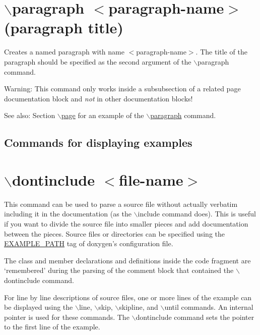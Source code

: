  \hypertarget{commands_cmdparagraph}{}\section{$\backslash$paragraph $<$paragraph-name$>$ (paragraph title)}\label{commands_cmdparagraph}
 Creates a named paragraph with name $<$paragraph-name$>$. The title of the paragraph should be specified as the second argument of the $\backslash$paragraph command.

\begin{Desc}
\item[Warning:]This command only works inside a subsubsection of a related page documentation block and {\em not\/} in other documentation blocks!\end{Desc}
\begin{Desc}
\item[See also:]Section \hyperlink{commands_cmdpage}{$\backslash$page} for an example of the \hyperlink{commands_cmdparagraph}{$\backslash$paragraph} command.\end{Desc}




\subsection*{ Commands for displaying examples }\hypertarget{commands_cmddontinclude}{}\section{$\backslash$dontinclude $<$file-name$>$}\label{commands_cmddontinclude}
 This command can be used to parse a source file without actually verbatim including it in the documentation (as the $\backslash$include command does). This is useful if you want to divide the source file into smaller pieces and add documentation between the pieces. Source files or directories can be specified using the \hyperlink{config_cfg_example_path}{EXAMPLE\_\-PATH} tag of doxygen's configuration file.

The class and member declarations and definitions inside the code fragment are `remembered' during the parsing of the comment block that contained the $\backslash$dontinclude command.

For line by line descriptions of source files, one or more lines of the example can be displayed using the $\backslash$line, $\backslash$skip, $\backslash$skipline, and $\backslash$until commands. An internal pointer is used for these commands. The $\backslash$dontinclude command sets the pointer to the first line of the example.

